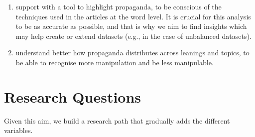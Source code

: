 \begin{enumerate}
\begin{enumerate}
        \item support with a tool to highlight propaganda, to be conscious of the techniques used in the articles at the word level. It is crucial for this analysis to be as accurate as possible, and that is why we aim to find insights which may help create or extend datasets (e.g., in the case of unbalanced datasets).
        \item understand better how propaganda distributes across leanings and topics, to be able to recognise more manipulation and be less manipulable.
    \end{enumerate}
\end{enumerate}









\section{\statusgreen Research Questions}
\label{sec:intro_rqs}

Given this aim, we build a research path that gradually adds the different variables.

